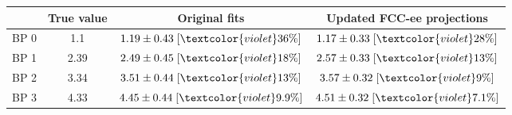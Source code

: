 \begin{tabular}{c||c|c|c|}
 & True value & Original fits & Updated FCC-ee projections\\
\hline\hline
BP 0 & 1.1 & $1.19\pm0.43\;[\textcolor{violet}{36\%}]$ & $1.17\pm0.33\;[\textcolor{violet}{28\%}]$\\\hline
BP 1 & 2.39 & $2.49\pm0.45\;[\textcolor{violet}{18\%}]$ & $2.57\pm0.33\;[\textcolor{violet}{13\%}]$\\\hline
BP 2 & 3.34 & $3.51\pm0.44\;[\textcolor{violet}{13\%}]$ & $3.57\pm0.32\;[\textcolor{violet}{9\%}]$\\\hline
BP 3 & 4.33 & $4.45\pm0.44\;[\textcolor{violet}{9.9\%}]$ & $4.51\pm0.32\;[\textcolor{violet}{7.1\%}]$\\
\end{tabular}
